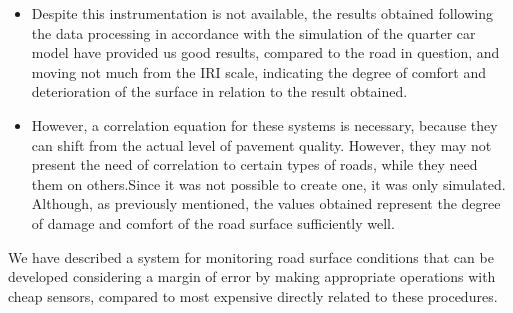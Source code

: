 \documentclass[tesi]{subfiles}
\begin{document}
\begin{description}
\begin{itemize}
\item Despite this instrumentation is not available, the results obtained following the data processing in accordance with the simulation of the quarter car model have provided us good results, compared to the road in question, and moving not much from the  IRI scale, indicating the degree of comfort and deterioration of the surface in relation to the result obtained.
\item However, a correlation equation for these systems is necessary, because they can shift from the actual level of pavement quality. However, they may not present the need of correlation to certain types of roads, while they need them on others.Since it was not possible to create one, it was only simulated. Although, as previously mentioned, the values obtained represent the degree of damage and comfort of the road surface sufficiently well.
\end{itemize}
\end{description}



\noindent  We have described a system for monitoring road surface conditions that can be developed considering a margin of error by making appropriate operations with cheap sensors, compared to most expensive directly related to these procedures. 
\end{document}
